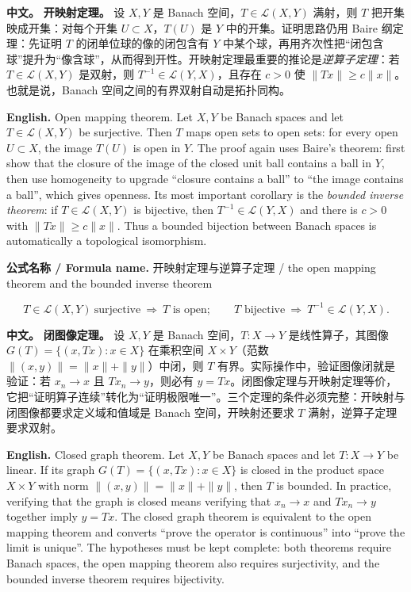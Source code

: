 \documentclass[UTF8,11pt,a4paper]{ctexart}
\newcommand{\FORMULA}[2]{\par\noindent\textbf{公式名称 / Formula name.} #1 / #2\par}
\newcommand{\APS}[2]{\par\noindent\textbf{中文。} #1\par\noindent\textbf{English.} #2\par\smallskip}
\begin{document}
\APS{\textbf{开映射定理。} 设 $X,Y$ 是 Banach 空间，$T\in\mathcal L(X,Y)$ 满射，则 $T$ 把开集映成开集：对每个开集 $U\subset X$，$T(U)$ 是 $Y$ 中的开集。证明思路仍用 Baire 纲定理：先证明 $T$ 的闭单位球的像的闭包含有 $Y$ 中某个球，再用齐次性把“闭包含球”提升为“像含球”，从而得到开性。开映射定理最重要的推论是\emph{逆算子定理}：若 $T\in\mathcal L(X,Y)$ 是双射，则 $T^{-1}\in\mathcal L(Y,X)$，且存在 $c>0$ 使 $\|Tx\|\ge c\|x\|$。也就是说，Banach 空间之间的有界双射自动是拓扑同构。}{Open mapping theorem. Let $X,Y$ be Banach spaces and let $T\in\mathcal L(X,Y)$ be surjective. Then $T$ maps open sets to open sets: for every open $U\subset X$, the image $T(U)$ is open in $Y$. The proof again uses Baire's theorem: first show that the closure of the image of the closed unit ball contains a ball in $Y$, then use homogeneity to upgrade ``closure contains a ball'' to ``the image contains a ball'', which gives openness. Its most important corollary is the \emph{bounded inverse theorem}: if $T\in\mathcal L(X,Y)$ is bijective, then $T^{-1}\in\mathcal L(Y,X)$ and there is $c>0$ with $\|Tx\|\ge c\|x\|$. Thus a bounded bijection between Banach spaces is automatically a topological isomorphism.}
\FORMULA{开映射定理与逆算子定理}{the open mapping theorem and the bounded inverse theorem}
\[
T\in\mathcal L(X,Y)\ \text{surjective}\ \Longrightarrow\ T \text{ is open};
\qquad
T \text{ bijective}\ \Longrightarrow\ T^{-1}\in\mathcal L(Y,X).
\]

\APS{\textbf{闭图像定理。} 设 $X,Y$ 是 Banach 空间，$T:X\to Y$ 是线性算子，其图像 $G(T)=\{(x,Tx):x\in X\}$ 在乘积空间 $X\times Y$（范数 $\|(x,y)\|=\|x\|+\|y\|$）中闭，则 $T$ 有界。实际操作中，验证图像闭就是验证：若 $x_n\to x$ 且 $Tx_n\to y$，则必有 $y=Tx$。闭图像定理与开映射定理等价，它把“证明算子连续”转化为“证明极限唯一”。三个定理的条件必须完整：开映射与闭图像都要求定义域和值域是 Banach 空间，开映射还要求 $T$ 满射，逆算子定理要求双射。}{Closed graph theorem. Let $X,Y$ be Banach spaces and let $T:X\to Y$ be linear. If its graph $G(T)=\{(x,Tx):x\in X\}$ is closed in the product space $X\times Y$ with norm $\|(x,y)\|=\|x\|+\|y\|$, then $T$ is bounded. In practice, verifying that the graph is closed means verifying that $x_n\to x$ and $Tx_n\to y$ together imply $y=Tx$. The closed graph theorem is equivalent to the open mapping theorem and converts ``prove the operator is continuous'' into ``prove the limit is unique''. The hypotheses must be kept complete: both theorems require Banach spaces, the open mapping theorem also requires surjectivity, and the bounded inverse theorem requires bijectivity.}
\end{document}
